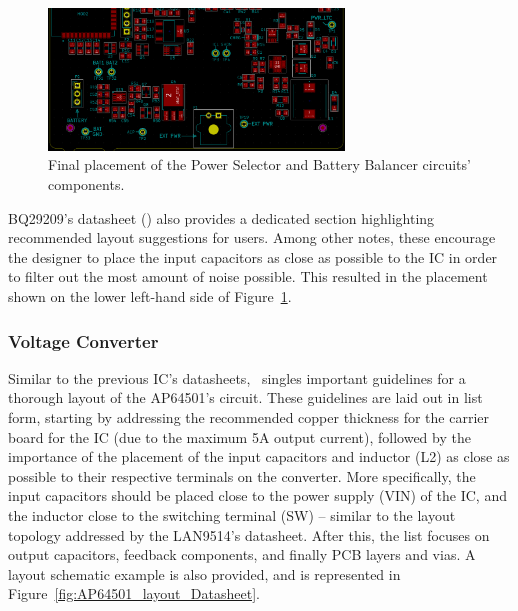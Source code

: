 \begin{figure}[h]
	\centering
	\includegraphics[width=0.7\textwidth]{Chapters/Figures/chapter5/placement_Power_Selector_and_BQ29209.png}
	\caption{Final placement of the Power Selector and Battery Balancer circuits' components.}
	\label{fig:placement_Power_Selector_and_BQ29209}
\end{figure}

BQ29209's datasheet (\cite{bq29209}) also provides a dedicated section highlighting recommended layout suggestions for users. Among other notes, these encourage the designer to place the input capacitors as close as possible to the IC in order to filter out the most amount of noise possible. This resulted in the placement shown on the lower left-hand side of Figure~\ref{fig:placement_Power_Selector_and_BQ29209}.


\subsubsection{Voltage Converter}\label{sec:5114_VoltageConverter}

Similar to the previous IC's datasheets,~\cite{AP64501} singles important guidelines for a thorough layout of the AP64501's circuit. These guidelines are laid out in list form, starting by addressing the recommended copper thickness for the carrier board for the IC (due to the maximum 5A output current), followed by the importance of the placement of the input capacitors and inductor (L2) as close as possible to their respective terminals on the converter. More specifically, the input capacitors should be placed close to the power supply (VIN) of the IC, and the inductor close to the switching terminal (SW) -- similar to the layout topology addressed by the LAN9514's datasheet. After this, the list focuses on output capacitors, feedback components, and finally PCB layers and vias. A layout schematic example is also provided, and is represented in Figure~\ref{fig:AP64501_layout_Datasheet}.

